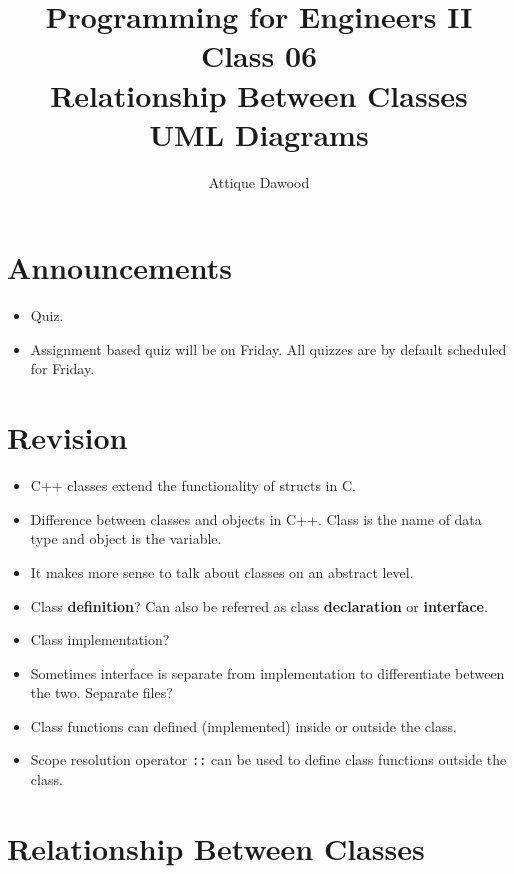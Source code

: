 \documentclass[12pt,a4paper]{article}
\title{\vspace{-2cm}Programming for Engineers II\\Class 06\\Relationship Between Classes\\UML Diagrams}
\author{Attique Dawood}
\begin{document}
\maketitle
\section{Announcements}
\begin{itemize}
\item Quiz.
\item Assignment based quiz will be on Friday. All quizzes are by default scheduled for Friday.
\end{itemize}
\section{Revision}
\begin{itemize}
\item C++ classes extend the functionality of structs in C.
\item Difference between classes and objects in C++. Class is the name of data type and object is the variable.
\item It makes more sense to talk about classes on an abstract level.
\item Class \textbf{definition}? Can also be referred as class \textbf{declaration} or \textbf{interface}.
\item Class implementation?
\item Sometimes interface is separate from implementation to differentiate between the two. Separate files?
\item Class functions can defined (implemented) inside or outside the class.
\item Scope resolution operator \verb|::| can be used to define class functions outside the class.
\end{itemize}
\section{Relationship Between Classes}
\end{document}
